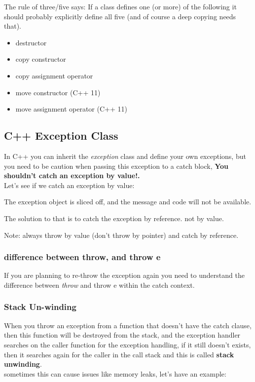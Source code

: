 \documentclass{article}
\begin{document}
The rule of three/five says: 
If a class defines one (or more) of the following it should probably explicitly define all five (and of course a deep copying needs that).
\begin{itemize}
  \item destructor
  \item copy constructor
  \item copy assignment operator
  \item move constructor (C++ 11)
  \item move assignment operator (C++ 11)
\end{itemize}

\subsection{C++ Exception Class}
In C++ you can inherit the \textit{exception} class and define your own exceptions, but you need to be caution when passing this exception to a catch block, \textbf{You shouldn't catch an exception by value!.}\\
Let's see if we catch an exception by value:


The exception object is sliced off, and the message and code will not be available.

The solution to that is to catch the exception by reference. not by value.


Note: always throw by value (don't throw by pointer) and catch by reference.\\

\subsubsection{difference between throw, and throw e}
If you are planning to re-throw the exception again you need to understand the difference between \textit{throw} and {throw e} within the catch context.\\



\subsubsection{Stack Un-winding}
When you throw an exception from a function that doesn't have the catch clause, then this function will be destroyed from the stack, and the exception handler searches on the caller function for the exception handling, if it still doesn't exists, then it searches again for the caller in the call stack and this is called \textbf{stack unwinding}.\\
sometimes this can cause issues like memory leaks, let's have an example:
\end{document}
